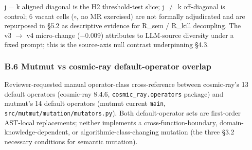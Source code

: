 \documentclass[review,12pt,authoryear]{elsarticle}
\begin{document}
j = k aligned diagonal is the H2 threshold-test slice; j $\neq$ k
off-diagonal is control; 6 vacant cells ($\circ$, no MR exercised) are not formally
adjudicated and are repurposed in §5.2 as descriptive evidence for
R\_sem / R\_kill decoupling. The v3 $\to$ v4 micro-change (−0.009)
attributes to LLM-source diversity under a fixed prompt; this is the
source-axis null contrast underpinning §4.3.

\subsubsection{B.6 Mutmut vs cosmic-ray default-operator overlap}\label{b.6-mutmut-vs-cosmic-ray-default-operator-overlap}

Reviewer-requested manual operator-class cross-reference between
cosmic-ray's 13 default operators (cosmic-ray 8.4.6,
\texttt{cosmic\_ray.operators} package) and mutmut's 14 default
operators (mutmut current \texttt{main},
\texttt{src/mutmut/mutation/mutators.py}). Both default-operator sets
are first-order AST-local replacements; neither implements a
cross-function-boundary, domain-knowledge-dependent, or
algorithmic-class-changing mutation (the three §3.2 necessary conditions
for semantic mutation).
\end{document}
